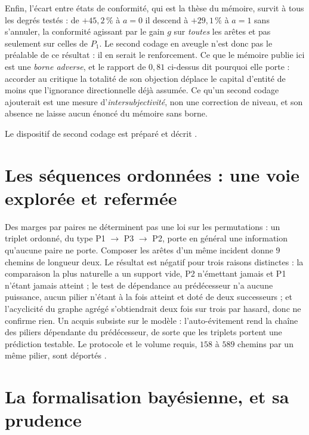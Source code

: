 Enfin, l'écart entre états de conformité, qui est la thèse du mémoire, survit à tous les degrés
testés : de $+45{,}2\,\%$ à $a=0$ il descend à $+29{,}1\,\%$ à $a=1$ sans s'annuler, la
conformité agissant par le gain $g$ sur \emph{toutes} les arêtes et pas seulement sur celles de
$P_1$. Le second codage en aveugle n'est donc pas le préalable de ce
résultat : il en serait le renforcement.
Ce que le mémoire publie ici est une
\emph{borne adverse}, et le rapport de $0{,}81$ ci-dessus dit pourquoi elle porte : accorder au
critique la totalité de son objection déplace le capital d'entité de moins que l'ignorance
directionnelle déjà assumée. Ce qu'un second codage ajouterait est une mesure
d'\emph{intersubjectivité}, non une correction de niveau, et son absence ne laisse aucun énoncé
du mémoire sans borne.

Le dispositif de second codage est préparé et décrit \matcomp.

\section{Les séquences ordonnées : une voie explorée et refermée}
\label{sec:sequences-ordonnees}

Des marges par paires ne déterminent pas une loi sur les permutations : un triplet ordonné,
du type P1 $\to$ P3 $\to$ P2, porte en général une information qu'aucune paire ne porte. Composer
les arêtes d'un même incident donne $9$ chemins de longueur deux. Le résultat est négatif pour
trois raisons distinctes : la comparaison la plus naturelle a un support vide, P2 n'émettant
jamais et P1 n'étant jamais atteint ; le test de dépendance au prédécesseur n'a aucune puissance,
aucun pilier n'étant à la fois atteint et doté de deux successeurs ; et l'acyclicité du graphe
agrégé s'obtiendrait deux fois sur trois par hasard, donc ne confirme rien. Un acquis subsiste
sur le modèle : l'auto-évitement rend la chaîne des piliers dépendante du prédécesseur, de sorte
que les triplets portent une prédiction testable. Le protocole et le volume requis, $158$ à
$589$ chemins par un même pilier, sont déportés \matcomp.


\section{La formalisation bayésienne, et sa prudence}
\label{sec:bayes}

